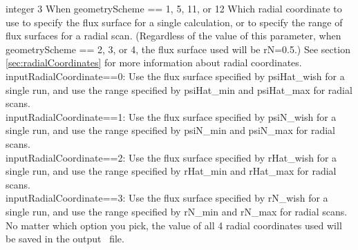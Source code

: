 \myhrule

{integer}
{3}
{When {\ttfamily geometryScheme} == 1, 5, 11, or 12}
{Which radial coordinate to use to specify the flux surface for a single calculation,
or to specify the range of flux surfaces for a radial scan. 
(Regardless of the value of this parameter, when {\ttfamily geometryScheme} == 2, 3, or 4, the flux surface used will be {\ttfamily rN}=0.5.)
See section \ref{sec:radialCoordinates}
for more information about radial coordinates.\\

{\ttfamily inputRadialCoordinate}==0: Use the flux surface specified by {\ttfamily psiHat\_wish}
for a single run, and use the range specified by {\ttfamily psiHat\_min} and {\ttfamily psiHat\_max} for radial scans.\\

{\ttfamily inputRadialCoordinate}==1: Use the flux surface specified by {\ttfamily psiN\_wish}
for a single run, and use the range specified by {\ttfamily psiN\_min} and {\ttfamily psiN\_max} for radial scans.\\

{\ttfamily inputRadialCoordinate}==2: Use the flux surface specified by {\ttfamily rHat\_wish}
for a single run, and use the range specified by {\ttfamily rHat\_min} and {\ttfamily rHat\_max} for radial scans.\\

{\ttfamily inputRadialCoordinate}==3: Use the flux surface specified by {\ttfamily rN\_wish}
for a single run, and use the range specified by {\ttfamily rN\_min} and {\ttfamily rN\_max} for radial scans. \\

No matter which option you pick, the value of all 4 radial coordinates used will be saved in the output \HDF~file.
}

\myhrule

